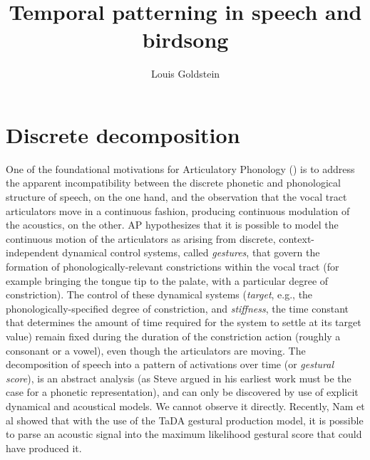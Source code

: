 \documentclass[output=paper,
modfonts
]{LSP/langsci}
\title{Temporal patterning in speech and birdsong}
\author{Louis Goldstein\affiliation{Department of Linguistics, University of Southern California}}
\begin{document}
\maketitle

\section{Discrete decomposition}

One of the foundational motivations for Articulatory Phonology (\citealt{BG92, BG95}) is to address the apparent incompatibility between the discrete phonetic and phonological structure of speech, on the one hand,  and the observation that the vocal tract articulators move in a continuous fashion, producing continuous modulation of the acoustics, on the other.  AP hypothesizes that it is possible to model the continuous motion of the articulators as arising from discrete, context-independent dynamical control systems, called \textit{gestures}, that govern the formation of phonologically-relevant constrictions within the vocal tract (for example bringing the tongue tip to the palate, with a particular degree of constriction). The control  of these dynamical systems (\textit{target}, e.g., the phonologically-specified degree of constriction,  and \textit{stiffness}, the time constant that determines the amount of time required for the system to settle at its target value) remain fixed during the duration of the constriction action (roughly a consonant or a vowel), even though the articulators are moving. The decomposition of speech into a pattern of  activations over time (or \textit{gestural score}), is an abstract analysis (as Steve argued in his earliest work \citep{anderson74} must be the case for a phonetic representation), and can only be discovered by use of  explicit dynamical and acoustical models.  We cannot observe it directly. Recently,  Nam et al  \citeyearpar{Nam2012} showed that with the use of the TaDA gestural production model, it is possible to parse an acoustic signal into the maximum likelihood gestural score that could have produced it.
\end{document}
